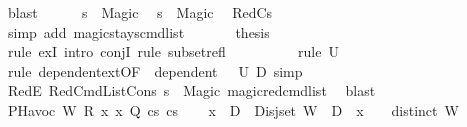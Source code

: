 \begin{isabellebody}
\ blast\isanewline
\ \ \ \ \isamarkupfalse%
\ {\isacartoucheopen}s{\isacharprime}{\kern0pt}{\isacharprime}{\kern0pt}\ {\isacharequal}{\kern0pt}\ Magic{\isacartoucheclose}\ \isamarkupfalse%
\ {\isachardoublequoteopen}s{\isacharprime}{\kern0pt}\ {\isacharequal}{\kern0pt}\ Magic{\isachardoublequoteclose}\ \isamarkupfalse%
\ RedCs{}\isanewline
\ \ \ \ \ \ \isamarkupfalse%
\ {\isacharparenleft}{\kern0pt}simp\ add{\isacharcolon}{\kern0pt}\ magic{\isacharunderscore}{\kern0pt}stays{\isacharunderscore}{\kern0pt}cmd{\isacharunderscore}{\kern0pt}list{\isacharparenright}{\kern0pt}\ \isanewline
\ \ \ \ \isamarkupfalse%
\ {\isacharquery}{\kern0pt}thesis\ \isanewline
\ \ \ \ \ \ \isamarkupfalse%
\ {\isacharparenleft}{\kern0pt}rule\ exI{\isacharcomma}{\kern0pt}\ intro\ conjI{\isacharcomma}{\kern0pt}\ rule\ subset{\isacharunderscore}{\kern0pt}refl{\isacharparenright}{\kern0pt}\isanewline
\ \ \ \ \ \ \ \ \isamarkupfalse%
\ {\isacharparenleft}{\kern0pt}rule\ {\isacartoucheopen}U{}\ {\isasymnoteq}\ {\isacharbraceleft}{\kern0pt}{\isacharbraceright}{\kern0pt}{\isacartoucheclose}{\isacharparenright}{\kern0pt}\isanewline
\ \ \ \ \ \ \ \isamarkupfalse%
\ {\isacharparenleft}{\kern0pt}rule\ dependent{\isacharunderscore}{\kern0pt}ext{\isacharbrackleft}{\kern0pt}OF\ {\isacharunderscore}{\kern0pt}\ {\isacartoucheopen}dependent\ {\isasymLambda}{\isacharprime}{\kern0pt}\ {\isasymOmega}\ U{}\ D{}{\isacartoucheclose}{\isacharbrackright}{\kern0pt}{\isacharcomma}{\kern0pt}\ simp{\isacharparenright}{\kern0pt}\isanewline
\ \ \ \ \ \ \isamarkupfalse%
\ RedE{}\ RedCmdListCons\ {\isacartoucheopen}s{\isacharprime}{\kern0pt}\ {\isacharequal}{\kern0pt}\ Magic{\isacartoucheclose}\ magic{\isacharunderscore}{\kern0pt}red{\isacharunderscore}{\kern0pt}cmd{\isacharunderscore}{\kern0pt}list\ \isamarkupfalse%
\ blast\isanewline
\ \ \isamarkupfalse%
\ \isanewline
{}\isamarkupfalse%
\isanewline
\ \ \isamarkupfalse%
\ {\isacharparenleft}{\kern0pt}PHavoc\ W\ R\ x\ x{\isacharprime}{\kern0pt}\ Q\ cs{}\ cs{}{\isacharparenright}{\kern0pt}\isanewline
\ \ \isamarkupfalse%
\ {\isachardoublequoteopen}x{\isacharprime}{\kern0pt}\ {\isasymnotin}\ D{}{\isachardoublequoteclose}\ \ Disj{\isacharcolon}{\kern0pt}{\isachardoublequoteopen}set\ W\ {\isasyminter}\ {\isacharparenleft}{\kern0pt}D{}\ {\isasymunion}\ {\isacharbraceleft}{\kern0pt}x{\isacharprime}{\kern0pt}{\isacharbraceright}{\kern0pt}{\isacharparenright}{\kern0pt}\ {\isacharequal}{\kern0pt}\ {\isacharbraceleft}{\kern0pt}{\isacharbraceright}{\kern0pt}{\isachardoublequoteclose}\ \ {\isachardoublequoteopen}distinct\ W{\isachardoublequoteclose}\ \isamarkupfalse%

\end{isabellebody}
